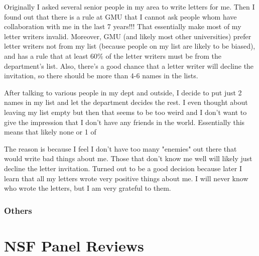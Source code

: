 \documentclass[oneside,11pt,dvipsnames]{book}
\begin{document}
Originally I asked several senior people in my area to write letters for me. Then I found out that there is a rule at GMU that I cannot ask people whom have collaboration with me in the last 7 years!!! That essentially make most of my letter writers invalid.  Moreover, GMU (and likely most other universities) prefer letter writers not from my list (because people on my list are likely to be biased), and has a rule that at least 60\% of the letter writers must be from the department's list. Also, there's a good chance that a letter writer will decline the invitation, so there should be more than 4-6 names in the lists.

After talking to various people in my dept and outside, I decide to put just 2 names in my list and let the department decides the rest. I even thought about leaving my list empty but then that seems to be too weird and I don't want to give the impression that I don't have any friends in the world.  Essentially this means that likely none or 1 of 

The reason is because I feel I don't have too many "enemies" out there that would write bad things about me.  Those that don't know me well will likely just decline the letter invitation.  Turned out to be a good decision because later I learn that all my letters wrote very positive things about me.  I will never know who wrote the letters, but I am very grateful to them.



\subsection{Others}

\appendix
\chapter{NSF Panel Reviews}



\end{document}
